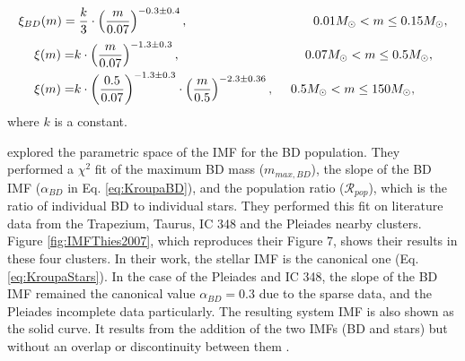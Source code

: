 \begin{equation}
\label{eq:KroupaBD}
\xi_{BD}(m)=\frac{k}{3}\cdot\left(\frac{m}{0.07}\right)^{-0.3\pm0.4}, \hspace{3.5cm} 0.01M_{\odot} < m \leq 0.15 M_{\odot},
\end{equation}
\begin{align}
\label{eq:KroupaStars}
\xi(m)=& k\cdot \left(\frac{m}{0.07}\right)^{-1.3\pm0.3}, \hspace{3.5cm} 0.07M_{\odot} < m \leq 0.5 M_{\odot},\nonumber\\
\xi(m)=& k\cdot \left(\frac{0.5}{0.07}\right)^{-1.3\pm0.3}\cdot  \left(\frac{m}{0.5}\right)^{-2.3\pm0.36}, \ \ \ \ 0.5 M_{\odot} < m \leq 150 M_{\odot},
\end{align}
where $k$ is a constant.
 
 \citet{Thies2007} explored the parametric space of the  IMF for the BD population. They performed a $\chi^2$ fit of the maximum BD mass ($m_{max,BD}$), the slope of the BD IMF ($\alpha_{BD}$ in Eq. \ref{eq:KroupaBD}), and the population ratio ($\mathcal{R}_{pop}$), which is the ratio of individual BD to individual stars. They performed this fit on literature data from the Trapezium, Taurus, IC 348 and the Pleiades nearby clusters. Figure \ref{fig:IMFThies2007}, which reproduces their Figure 7, shows their results in these four clusters. In their work, the stellar IMF is the canonical one (Eq. \ref{eq:KroupaStars}). In the case of the Pleiades and IC 348, the slope of the BD IMF remained the canonical value $\alpha_{BD}=0.3$ due to the sparse data, and the Pleiades  incomplete data particularly. The resulting system IMF is also shown as the solid curve. It results from the addition of the two IMFs (BD and stars) but without an overlap or discontinuity between them \cite[see][for details]{Thies2007}.
 
